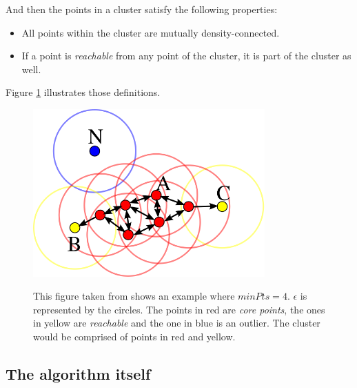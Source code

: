And then the points in a cluster satisfy the following properties\cite{dbscan}:
\begin{itemize}
	\item All points within the cluster are mutually density-connected.
	\item If a point is \emph{reachable} from any point of the cluster, it is part of the cluster as well.
\end{itemize}

Figure \ref{fig:reachExample} illustrates those definitions.

\begin{figure}
\centering
{\includegraphics[width=3.5in]{images/reach_example.png}}
\caption{This figure taken from \cite{dbscan} shows an example where $minPts=4$. $\epsilon$ is represented by the circles. The points in red are \emph{core points}, the ones in yellow are \emph{reachable} and the one in blue is an outlier. The cluster would be comprised of points in red and yellow.}
\label{fig:reachExample}
\end{figure}

\subsection{The algorithm itself}


